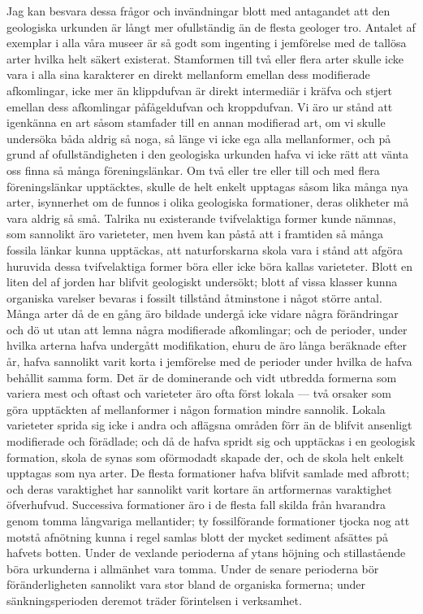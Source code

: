 Jag kan besvara dessa frågor och invändningar blott med antagandet att den geologiska urkunden är långt mer ofullständig än de flesta geologer tro. Antalet af exemplar i alla våra museer är så godt som ingenting i jemförelse med de tallösa arter hvilka helt säkert existerat. Stamformen till två eller flera arter skulle icke vara i alla sina karakterer en direkt mellanform emellan dess modifierade afkomlingar, icke mer än klippdufvan är direkt intermediär i kräfva och stjert emellan dess afkomlingar påfågeldufvan och kroppdufvan. Vi äro ur stånd att igenkänna en art såsom stamfader till en annan modifierad art, om vi skulle undersöka båda aldrig så noga, så länge vi icke ega alla mellanformer, och på grund af ofullständigheten i den geologiska urkunden hafva vi icke rätt att vänta oss finna så många föreningslänkar. Om två eller tre eller till och med flera föreningslänkar upptäcktes, skulle de helt enkelt upptagas såsom lika många nya arter, isynnerhet om de funnos i olika geologiska formationer, deras olikheter må vara aldrig så små. Talrika nu existerande tvifvelaktiga former kunde nämnas, som sannolikt äro varieteter, men hvem kan påstå att i framtiden så många fossila länkar kunna upptäckas, att naturforskarna skola vara i stånd att afgöra huruvida dessa tvifvelaktiga former böra eller icke böra kallas varieteter. Blott en liten del af jorden har blifvit geologiskt undersökt; blott af vissa klasser kunna organiska varelser bevaras i fossilt tillstånd åtminstone i något större antal. Många arter då de en gång äro bildade undergå icke vidare några förändringar och dö ut utan att lemna några modifierade afkomlingar; och de perioder, under hvilka arterna hafva undergått modifikation, ehuru de äro långa beräknade efter år, hafva sannolikt varit korta i jemförelse med de perioder under hvilka de hafva behållit samma form. Det är de dominerande och vidt utbredda formerna som variera mest och oftast och varieteter äro ofta först lokala — två orsaker som göra upptäckten af mellanformer i någon formation mindre sannolik. Lokala varieteter sprida sig icke i andra och aflägsna områden förr än de blifvit ansenligt modifierade och förädlade; och då de hafva spridt sig och upptäckas i en geologisk formation, skola de synas som oförmodadt skapade der, och de skola helt enkelt upptagas som nya arter. De flesta formationer hafva blifvit samlade med afbrott; och deras varaktighet har sannolikt varit kortare än artformernas varaktighet öfverhufvud. Successiva formationer äro i de flesta fall skilda från hvarandra genom tomma långvariga mellantider; ty fossilförande formationer tjocka nog att motstå afnötning kunna i regel samlas blott der mycket sediment afsättes på hafvets botten. Under de vexlande perioderna af ytans höjning och stillastående böra urkunderna i allmänhet vara tomma. Under de senare perioderna bör föränderligheten sannolikt vara stor bland de organiska formerna; under sänkningsperioden deremot träder förintelsen i verksamhet.

